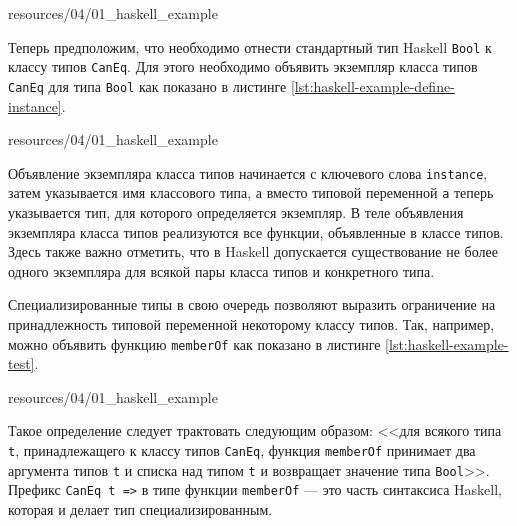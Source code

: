 
{resources/04/01_haskell_example}

Теперь предположим, что необходимо отнести стандартный тип Haskell \lstinline{Bool} к классу типов \lstinline{CanEq}. Для этого необходимо объявить экземпляр класса типов \lstinline{CanEq} для типа \lstinline{Bool} как показано в листинге \ref{lst:haskell-example-define-instance}.


{resources/04/01_haskell_example}

Объявление экземпляра класса типов начинается с ключевого слова \lstinline{instance}, затем указывается имя классового типа, а вместо типовой переменной \lstinline{a} теперь указывается тип, для которого определяется экземпляр. В теле объявления экземпляра класса типов реализуются все функции, объявленные в классе типов. Здесь также важно отметить, что в Haskell допускается существование не более одного экземпляра для всякой пары класса типов и конкретного типа. 

Специализированные типы в свою очередь позволяют выразить ограничение на принадлежность типовой переменной некоторому классу типов. Так, например, можно объявить функцию \lstinline{memberOf} как показано в листинге \ref{lst:haskell-example-test}. 


{resources/04/01_haskell_example}

Такое определение следует трактовать следующим образом: <<для всякого типа \lstinline{t}, принадлежащего к классу типов \lstinline{CanEq}, функция \lstinline{memberOf} принимает два аргумента типов \lstinline{t} и списка над типом \lstinline{t} и возвращает значение типа \lstinline{Bool}>>. Префикс \lstinline{CanEq t =>} в типе функции \lstinline{memberOf} --- это часть синтаксиса Haskell, которая и делает тип специализированным.

